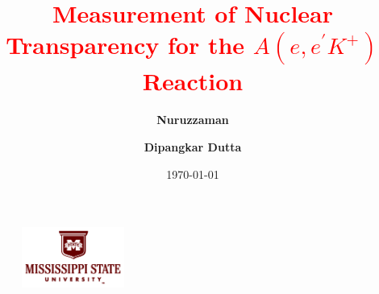\documentclass[aps,11pt]{revtex4}
\begin{document}

\title{\huge \textcolor{red}{Measurement of Nuclear Transparency for the  $A(e,e^\prime K^+)$ Reaction}}
\author{\textbf{Nuruzzaman}}
\author{\textbf{Dipangkar Dutta}}
\date{\today}
\begin{figure}[b]
	\includegraphics[width=0.30\textwidth]{MSU_logo.png}
	\label{fig:MSU_logo}
\end{figure}

\end{document}
